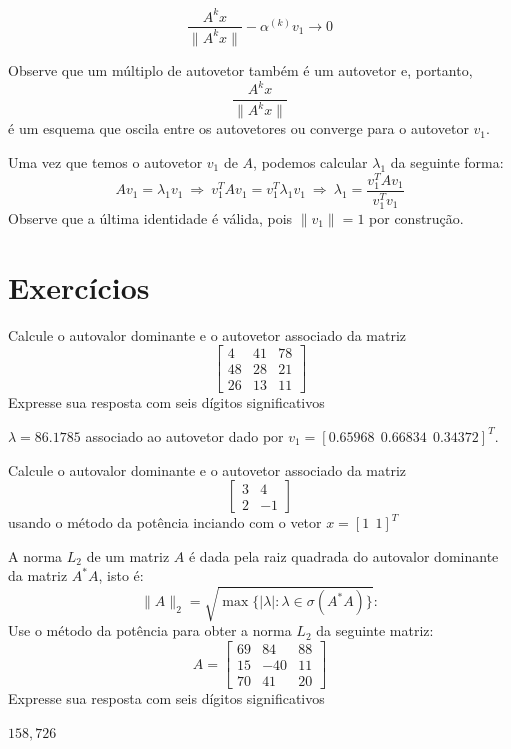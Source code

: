 $$\frac{A^k {x}}{\|A^k {x}\|}-\alpha^{(k)}{v}_1 \to 0$$

Observe que um múltiplo de autovetor  também é um autovetor e, portanto, 
$$
\frac{A^k {x}}{\|A^k {x}\|}
$$
é um esquema que oscila entre os autovetores ou converge para o autovetor ${v}_1$.


Uma vez que temos o autovetor ${v}_1$ de $A$, podemos calcular $\lambda_1$ da seguinte forma:
$$
A{v}_1=\lambda_1 {v}_1 ~\Longrightarrow~ {v}_1^TA{v}_1={v}_1^T\lambda_1 {v}_1 ~ \Longrightarrow~ \lambda_1=\frac{{v}_1^TA{v}_1}{{v}_1^T{v}_1}
$$
Observe que a última identidade é válida, pois $\|{v}_1\|=1$ por construção.

\section*{Exercícios}

\begin{Exercise} Calcule o autovalor dominante e o autovetor associado da matriz
$$\left[\begin{array}{ccc}
 4&     41  &  78\\
 48   & 28&    21  \\
 26   & 13 &   11
\end{array}\right]
$$
Expresse sua resposta com seis dígitos significativos
\end{Exercise}
\begin{Answer}$\lambda=86.1785$ associado ao autovetor dado por $v_1=\left[ 0.65968~~ 0.66834~~ 0.34372\right]^T$.
\end{Answer}

\begin{Exercise}Calcule o autovalor dominante e o autovetor associado da matriz
$$
\left[\begin{array}{cc}
3&4\\2&-1
\end{array}\right]
$$
usando o método da potência inciando com o vetor $x=[1~~  1]^T$
\end{Exercise}

\begin{Exercise} A norma $L_2$ de um matriz $A$  é dada pela raiz quadrada do autovalor dominante da matriz $A^*A$, isto é: $$\|A\|_2=\sqrt{\max\{|\lambda|: \lambda\in\sigma(A^*A)\}}:$$
Use o método da potência para obter a norma $L_2$ da seguinte matriz:
$$A=\left[\begin{array}{ccc}

    69&    84&    88\\
    15&  - 40&    11\\
    70&    41&    20
\end{array}\right]
$$
Expresse sua resposta com seis dígitos significativos
\end{Exercise}
\begin{Answer} $158,726$
\end{Answer}


